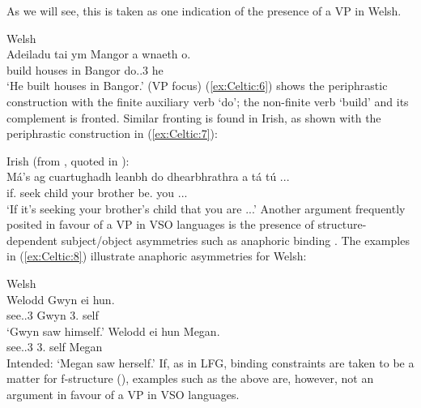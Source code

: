 \documentclass[output=paper,colorlinks,citecolor=brown]{langscibook}
\begin{document}
As we will see, this is taken as one indication of the presence of a VP in Welsh.

\ea\label{ex:Celtic:6} Welsh \citep[128]{bresnan2001lexical}\\
\gll Adeiladu tai  ym Mangor a  wnaeth o.\\
build  houses in Bangor {\REL} {do.\PST.3\SG} he\\
\glt`He built houses in Bangor.' (VP focus) 
\z 
(\ref{ex:Celtic:6}) shows the periphrastic construction with the finite auxiliary verb `do'; the non-finite verb `build' and its complement is fronted. Similar fronting is found in Irish, as shown with the periphrastic construction in (\ref{ex:Celtic:7}):

\ea\label{ex:Celtic:7} Irish (from \citealt{McCloskey1983}, quoted in \citealt[14]{Carnie2005}):\\
\gll Má's  ag  cuartughadh leanbh do dhearbhrathra a tá tú ...\\
{if.\COP} {\PROG}  seek  child your brother  {\REL} {be.\PRS} you ...\\
\glt`If it's seeking your brother's child that you are ...'
\z
Another argument frequently posited in favour of a VP in VSO languages is the presence of structure-dependent subject/object asymmetries such as anaphoric binding \citep[5--6 and references therein]{CarnieGuilfoyle2000}. The examples in (\ref{ex:Celtic:8}) illustrate anaphoric asymmetries for Welsh:

\ea\label{ex:Celtic:8} Welsh \citep[476]{Borsley2006}\\
\ea\gll Welodd Gwyn  ei  hun.\\
{see.\PRS.3\SG}  Gwyn 3\SG.{\M} self\\
\glt`Gwyn saw himself.'
\ex
\gll *Welodd ei  hun Megan.\\
{see.\PRS.3\SG}  {3\SG.\F\footnotemark} self Megan\\
\glt Intended: `Megan saw herself.'
\z\z
If, as in LFG, binding constraints are taken to be a matter for f-structure (), examples such as the above are, however, not an argument in favour of a VP in VSO languages.
\end{document}
